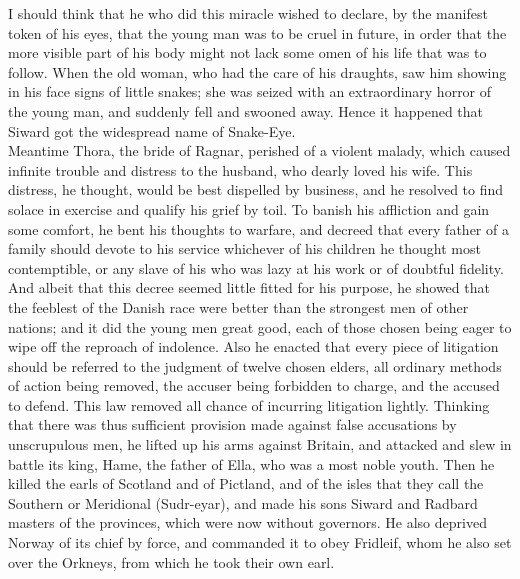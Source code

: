 \documentclass[10pt,a4paper]{report}
\begin{document}
I should think that he who did this miracle wished to declare, by the manifest token of his eyes, that the young man was to be cruel in future, in order that the more visible part of his body might not lack some omen of his life that was to follow. When the old woman, who had the care of his draughts, saw him showing in his face signs of little snakes; she was seized with an extraordinary horror of the young man, and suddenly fell and swooned away. Hence it happened that Siward got the widespread name of Snake-Eye.\\

Meantime Thora, the bride of Ragnar, perished of a violent malady, which caused infinite trouble and distress to the husband, who dearly loved his wife. This distress, he thought, would be best dispelled by business, and he resolved to find solace in exercise and qualify his grief by toil. To banish his affliction and gain some comfort, he bent his thoughts to warfare, and decreed that every father of a family should devote to his service whichever of his children he thought most contemptible, or any slave of his who was lazy at his work or of doubtful fidelity. And albeit that this decree seemed little fitted for his purpose, he showed that the feeblest of the Danish race were better than the strongest men of other nations; and it did the young men great good, each of those chosen being eager to wipe off the reproach of indolence. Also he enacted that every piece of litigation should be referred to the judgment of twelve chosen elders, all ordinary methods of action being removed, the accuser being forbidden to charge, and the accused to defend. This law removed all chance of incurring litigation lightly. Thinking that there was thus sufficient provision made against false accusations by unscrupulous men, he lifted up his arms against Britain, and attacked and slew in battle its king, Hame, the father of Ella, who was a most noble youth. Then he killed the earls of Scotland and of Pictland, and of the isles that they call the Southern or Meridional (Sudr-eyar), and made his sons Siward and Radbard masters of the provinces, which were now without governors. He also deprived Norway of its chief by force, and commanded it to obey Fridleif, whom he also set over the Orkneys, from which he took their own earl.\\
\end{document}
